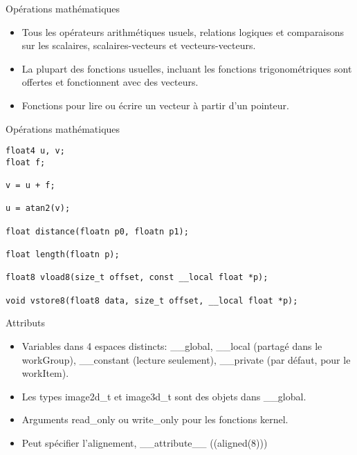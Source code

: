 \documentclass[10pt]{beamer}
\begin{document}
\begin{frame}{Opérations mathématiques}

  \begin{itemize}
    \item Tous les opérateurs arithmétiques usuels, relations logiques et comparaisons sur les scalaires, scalaires-vecteurs et vecteurs-vecteurs.

    \item La plupart des fonctions usuelles, incluant les fonctions trigonométriques sont offertes et fonctionnent avec des vecteurs.

    \item Fonctions pour lire ou écrire un vecteur à partir d'un pointeur.
  \end{itemize}
\end{frame}

\begin{frame}[fragile]{Opérations mathématiques}

  \scriptsize
  \begin{verbatim}
float4 u, v;
float f;

v = u + f;

u = atan2(v);

float distance(floatn p0, floatn p1);

float length(floatn p);

float8 vload8(size_t offset, const __local float *p);

void vstore8(float8 data, size_t offset, __local float *p);
  \end{verbatim}
\end{frame}

\begin{frame}{Attributs}

  \begin{itemize}
    \item Variables dans 4 espaces distincts: \_\_global, \_\_local (partagé dans le workGroup), \_\_constant (lecture seulement), \_\_private (par défaut, pour le workItem).

    \item Les types image2d\_t et image3d\_t sont des objets dans \_\_global.

    \item Arguments read\_only ou write\_only pour les fonctions kernel.

    \item Peut spécifier l'alignement, \_\_attribute\_\_ ((aligned(8)))
  \end{itemize}
\end{frame}
\end{document}

